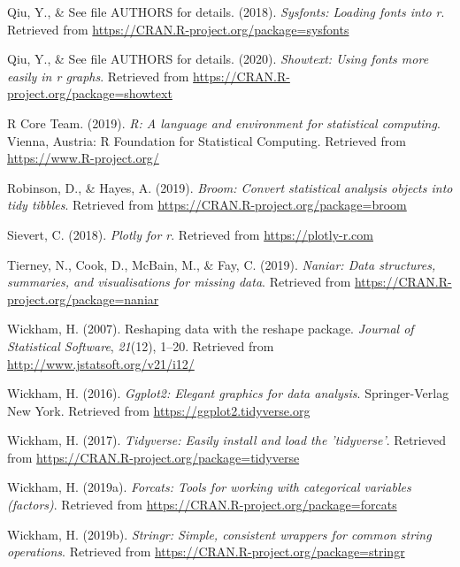 \documentclass[english,man,floatsintext]{apa6}
\begin{document}
\leavevmode\hypertarget{ref-R-sysfonts}{}%
Qiu, Y., \& See file AUTHORS for details. (2018). \emph{Sysfonts: Loading fonts into r}. Retrieved from \url{https://CRAN.R-project.org/package=sysfonts}

\leavevmode\hypertarget{ref-R-showtext}{}%
Qiu, Y., \& See file AUTHORS for details. (2020). \emph{Showtext: Using fonts more easily in r graphs}. Retrieved from \url{https://CRAN.R-project.org/package=showtext}

\leavevmode\hypertarget{ref-R-base}{}%
R Core Team. (2019). \emph{R: A language and environment for statistical computing}. Vienna, Austria: R Foundation for Statistical Computing. Retrieved from \url{https://www.R-project.org/}

\leavevmode\hypertarget{ref-R-broom}{}%
Robinson, D., \& Hayes, A. (2019). \emph{Broom: Convert statistical analysis objects into tidy tibbles}. Retrieved from \url{https://CRAN.R-project.org/package=broom}

\leavevmode\hypertarget{ref-R-plotly}{}%
Sievert, C. (2018). \emph{Plotly for r}. Retrieved from \url{https://plotly-r.com}

\leavevmode\hypertarget{ref-R-naniar}{}%
Tierney, N., Cook, D., McBain, M., \& Fay, C. (2019). \emph{Naniar: Data structures, summaries, and visualisations for missing data}. Retrieved from \url{https://CRAN.R-project.org/package=naniar}

\leavevmode\hypertarget{ref-R-reshape2}{}%
Wickham, H. (2007). Reshaping data with the reshape package. \emph{Journal of Statistical Software}, \emph{21}(12), 1--20. Retrieved from \url{http://www.jstatsoft.org/v21/i12/}

\leavevmode\hypertarget{ref-R-ggplot2}{}%
Wickham, H. (2016). \emph{Ggplot2: Elegant graphics for data analysis}. Springer-Verlag New York. Retrieved from \url{https://ggplot2.tidyverse.org}

\leavevmode\hypertarget{ref-R-tidyverse}{}%
Wickham, H. (2017). \emph{Tidyverse: Easily install and load the 'tidyverse'}. Retrieved from \url{https://CRAN.R-project.org/package=tidyverse}

\leavevmode\hypertarget{ref-R-forcats}{}%
Wickham, H. (2019a). \emph{Forcats: Tools for working with categorical variables (factors)}. Retrieved from \url{https://CRAN.R-project.org/package=forcats}

\leavevmode\hypertarget{ref-R-stringr}{}%
Wickham, H. (2019b). \emph{Stringr: Simple, consistent wrappers for common string operations}. Retrieved from \url{https://CRAN.R-project.org/package=stringr}
\end{document}
